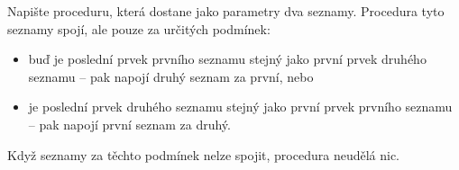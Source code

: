 \question[50]
Napište proceduru, která dostane jako parametry dva seznamy. Procedura tyto
seznamy spojí, ale pouze za určitých podmínek:
\begin{itemize}
	\item buď je poslední prvek prvního seznamu stejný jako první prvek druhého
	seznamu -- pak napojí druhý seznam za první, nebo
	\item je poslední prvek druhého seznamu stejný jako první prvek prvního
	seznamu -- pak napojí první seznam za druhý.
\end{itemize}
Když seznamy za těchto podmínek nelze spojit, procedura neudělá nic.